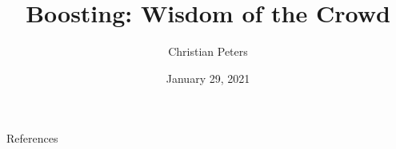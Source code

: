 \documentclass[10pt]{beamer}
\title{Boosting: Wisdom of the Crowd}
\date{January 29, 2021}
\author{Christian Peters}
\begin{document}
\maketitle





	





\appendix

\begin{frame}[allowframebreaks]{References}

  \nocite{SSBD14, FREUND1997119, kv-lbffahf-88, boosting, XGBoost}

  
  

\end{frame}
\end{document}
